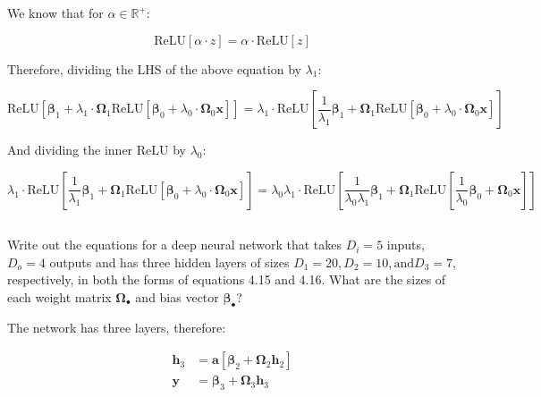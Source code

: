 \documentclass[12pt]{report}
\begin{document}
We know that for $\alpha \in \mathbb{R}^{+}$:

\begin{equation*}
    \text{ReLU}[\alpha \cdot z] = \alpha \cdot \text{ReLU}[z]
\end{equation*}

Therefore, dividing the LHS of the above equation by $\lambda_{1}$:

\begin{equation*}
    \text{ReLU}\left[\boldsymbol{\beta}_{1} + \lambda_{1}\cdot\boldsymbol{\Omega}_{1}\text{ReLU}\left[\boldsymbol{\beta}_{0} +\lambda_{0}\cdot\boldsymbol{\Omega}_{0}\mathbf{x}\right]\right]
    =
    \lambda_{1}\cdot
    \text{ReLU}\left[\frac{1}{\lambda_{1}}\boldsymbol{\beta}_{1} + \boldsymbol{\Omega}_{1}\text{ReLU}\left[\boldsymbol{\beta}_{0} +\lambda_{0}\cdot\boldsymbol{\Omega}_{0}\mathbf{x}\right]\right]
\end{equation*}

And dividing the inner $\text{ReLU}$ by $\lambda_{0}$:

\begin{equation*}
    \lambda_{1}\cdot
    \text{ReLU}\left[\frac{1}{\lambda_{1}}\boldsymbol{\beta}_{1} + \boldsymbol{\Omega}_{1}\text{ReLU}\left[\boldsymbol{\beta}_{0} +\lambda_{0}\cdot\boldsymbol{\Omega}_{0}\mathbf{x}\right]\right]
    =
    \lambda_{0}\lambda_{1}\cdot\text{ReLU}
    \left[\frac{1}{\lambda_{0}\lambda_{1}}\boldsymbol{\beta}_{1} + \boldsymbol{\Omega}_{1}\text{ReLU}\left[\frac{1}{\lambda_{0}}\boldsymbol{\beta}_{0}+\boldsymbol{\Omega}_{0}\mathbf{x}\right]\right]
\end{equation*}

\subsection{}
\begin{mdframed}
    Write out the equations for a deep neural network that takes $D_{i} = 5$ inputs, $D_{o} = 4$ outputs and has three hidden layers of sizes $D_{1} = 20, D_{2} = 10, \text{and} D_{3} = 7$, respectively, in both the forms of equations 4.15 and 4.16. What are the sizes of each weight matrix $\boldsymbol{\Omega}_{\bullet}$ and bias vector $\boldsymbol{\beta}_{\bullet}$?
\end{mdframed}

The network has three layers, therefore:

\begin{align*}
    \mathbf{h}_{3} & = \mathbf{a}[\boldsymbol{\beta}_{2} + \boldsymbol{\Omega}_2\mathbf{h}_{2}] \\
    \mathbf{y}     & = \boldsymbol{\beta}_{3} + \boldsymbol{\Omega}_{3}\mathbf{h}_{3}
\end{align*}
\end{document}
